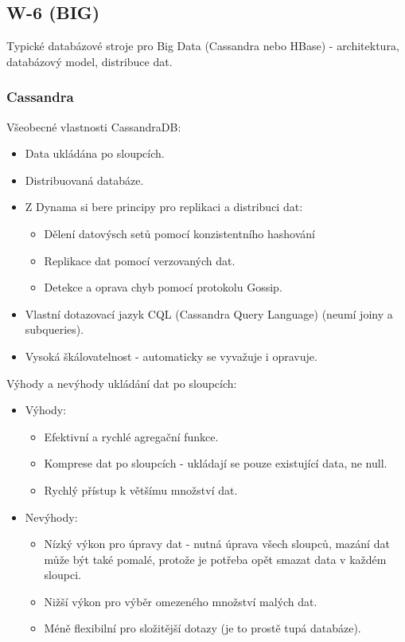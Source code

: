 \subsection{W-6 (BIG)}

Typické databázové stroje pro Big Data (Cassandra nebo HBase) - architektura, databázový model, distribuce dat.

\subsubsection*{Cassandra}

Všeobecné vlastnosti CassandraDB:

\begin{itemize}
  \item Data ukládána po sloupcích.
  \item Distribuovaná databáze. 
  \item Z Dynama si bere principy pro replikaci a distribuci dat:
  \begin{itemize}
    \item Dělení datovýsch setů pomocí konzistentního hashování
    \item Replikace dat pomocí verzovaných dat.
    \item Detekce a oprava chyb pomocí protokolu Gossip.
  \end{itemize}
  \item Vlastní dotazovací jazyk CQL (Cassandra Query Language) (neumí joiny a subqueries).
  \item Vysoká škálovatelnost - automaticky se vyvažuje i opravuje.
\end{itemize}

Výhody a nevýhody ukládání dat po sloupcích:
\begin{itemize}
  \item Výhody:
  \begin{itemize}
    \item Efektivní a rychlé agregační funkce.
    \item Komprese dat po sloupcích - ukládají se pouze existující data, ne null.
    \item Rychlý přístup k většímu množství dat.
  \end{itemize}
  \item Nevýhody:
  \begin{itemize}
    \item Nízký výkon pro úpravy dat - nutná úprava všech sloupců, mazání dat může být také pomalé, protože je potřeba opět smazat data v každém sloupci.
    \item Nižší výkon pro výběr omezeného množství malých dat.
    \item Méně flexibilní pro složitější dotazy (je to prostě tupá databáze).
  \end{itemize}
\end{itemize}

